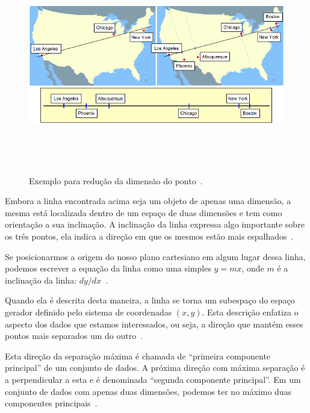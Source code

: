 	\begin{figure}[hbt]
		\begin{center}
			\includegraphics[height=9.5cm,width=12.5cm]{figuras/2.FundamentacaoTeorica/PCAexemploMapa.png}
		\end{center}
		\caption{Exemplo para redução da dimensão do ponto~\cite{hewitt}.}
		\label{exemploPCA}
	\end{figure}

Embora a linha encontrada acima seja um objeto de apenas uma dimensão, a mesma está localizada dentro de um espaço de duas dimensões e tem como orientação a sua inclinação. A inclinação da linha expressa algo importante sobre os três pontos, ela indica a direção em que os mesmos estão mais espalhados~\cite{hewitt}.

Se posicionarmos a origem do nosso plano cartesiano em algum lugar dessa linha, podemos escrever a equação da linha como uma simples $y = mx$, onde $\displaystyle m$ é a inclinação da linha: $dy / dx$~\cite{hewitt}.

Quando ela é descrita desta maneira, a linha se torna um subespaço do espaço gerador definido pelo sistema de coordenadas $\displaystyle (x,y)$. Esta descrição enfatiza o aspecto dos dados que estamos interessados, ou seja, a direção que mantém esses pontos mais separados um do outro~\cite{hewitt}.

Esta direção da separação máxima é chamada de ``primeira componente principal'' de um conjunto de dados. A próxima direção com máxima separação é a perpendicular a esta e é denominada ``segunda componente principal''. Em um conjunto de dados com apenas duas dimensões, podemos ter no máximo duas componentes principais~\cite{hewitt}.


